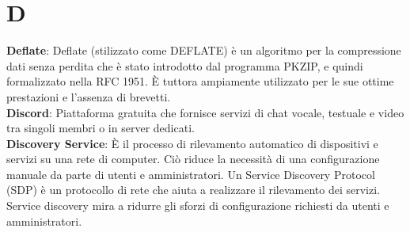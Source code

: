 \section*{D}
\textbf{Deflate}: Deflate (stilizzato come DEFLATE) è un algoritmo per la compressione dati senza perdita che è stato introdotto dal programma PKZIP, e quindi formalizzato nella RFC 1951. È tuttora ampiamente utilizzato per le sue ottime prestazioni e l'assenza di brevetti.\\
\textbf{Discord}: Piattaforma gratuita che fornisce servizi di chat vocale, testuale e video tra singoli membri o in server dedicati.\\
\textbf{Discovery Service}: È il processo di rilevamento automatico di dispositivi e servizi su una rete di computer. Ciò riduce la necessità di una configurazione manuale da parte di utenti e amministratori. Un Service Discovery Protocol (SDP) è un protocollo di rete che aiuta a realizzare il rilevamento dei servizi. Service discovery mira a ridurre gli sforzi di configurazione richiesti da utenti e amministratori.\\